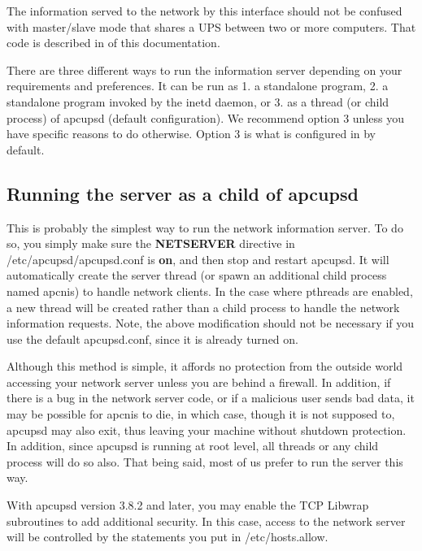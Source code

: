 {{{{{{{{{The information served to the network by this interface should not be confused
with master/slave mode that shares a UPS between two or more computers. That
code is described in 
 of this
documentation.  

There are three different ways to run the information server depending on your
requirements and preferences. It can be run as 1.  a standalone program, 2. a
standalone program invoked by the inetd daemon, or 3. as a thread (or child
process) of apcupsd (default configuration). We recommend option 3 unless you
have specific reasons to do otherwise. Option 3 is what is configured in by
default. 

\label{Running-the-server-as-a-child-of-apcupsd}

\subsection*{Running the server as a child of apcupsd}

This is probably the simplest way to run the network information server. To do
so, you simply make sure the {\bf NETSERVER} directive in
/etc/apcupsd/apcupsd.conf is {\bf on}, and then stop and restart apcupsd. It
will automatically create the server thread (or spawn an additional child
process named apcnis) to handle network clients. In the case where pthreads
are enabled, a new thread will be created rather than a child process to
handle the network information requests. Note, the above modification should
not be necessary if you use the default apcupsd.conf, since it is already
turned on.  

Although this method is simple, it affords no protection from the outside
world accessing your network server unless you are behind a firewall. In
addition, if there is a bug in the network server code, or if a malicious user
sends bad data, it may be possible for apcnis to die, in which case, though it
is not supposed to, apcupsd may also exit, thus leaving your machine without
shutdown protection. In addition, since apcupsd is running at root level, all
threads or any child process will do so also. That being said, most of us
prefer to run the server this way.  

With apcupsd version 3.8.2 and later, you may enable the TCP Libwrap
subroutines to add additional security. In this case, access to the network
server will be controlled by the statements you put in /etc/hosts.allow. 

}}}}}}}}}
